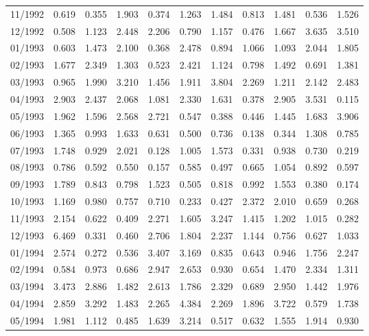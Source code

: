 \begin{tabular}{lrrrrrrrrrr}
11/1992 &  0.619 &  0.355 &  1.903 &  0.374 &  1.263 &  1.484 &  0.813 &  1.481 &  0.536 &  1.526 \\
12/1992 &  0.508 &  1.123 &  2.448 &  2.206 &  0.790 &  1.157 &  0.476 &  1.667 &  3.635 &  3.510 \\
01/1993 &  0.603 &  1.473 &  2.100 &  0.368 &  2.478 &  0.894 &  1.066 &  1.093 &  2.044 &  1.805 \\
02/1993 &  1.677 &  2.349 &  1.303 &  0.523 &  2.421 &  1.124 &  0.798 &  1.492 &  0.691 &  1.381 \\
03/1993 &  0.965 &  1.990 &  3.210 &  1.456 &  1.911 &  3.804 &  2.269 &  1.211 &  2.142 &  2.483 \\
04/1993 &  2.903 &  2.437 &  2.068 &  1.081 &  2.330 &  1.631 &  0.378 &  2.905 &  3.531 &  0.115 \\
05/1993 &  1.962 &  1.596 &  2.568 &  2.721 &  0.547 &  0.388 &  0.446 &  1.445 &  1.683 &  3.906 \\
06/1993 &  1.365 &  0.993 &  1.633 &  0.631 &  0.500 &  0.736 &  0.138 &  0.344 &  1.308 &  0.785 \\
07/1993 &  1.748 &  0.929 &  2.021 &  0.128 &  1.005 &  1.573 &  0.331 &  0.938 &  0.730 &  0.219 \\
08/1993 &  0.786 &  0.592 &  0.550 &  0.157 &  0.585 &  0.497 &  0.665 &  1.054 &  0.892 &  0.597 \\
09/1993 &  1.789 &  0.843 &  0.798 &  1.523 &  0.505 &  0.818 &  0.992 &  1.553 &  0.380 &  0.174 \\
10/1993 &  1.169 &  0.980 &  0.757 &  0.710 &  0.233 &  0.427 &  2.372 &  2.010 &  0.659 &  0.268 \\
11/1993 &  2.154 &  0.622 &  0.409 &  2.271 &  1.605 &  3.247 &  1.415 &  1.202 &  1.015 &  0.282 \\
12/1993 &  6.469 &  0.331 &  0.460 &  2.706 &  1.804 &  2.237 &  1.144 &  0.756 &  0.627 &  1.033 \\
01/1994 &  2.574 &  0.272 &  0.536 &  3.407 &  3.169 &  0.835 &  0.643 &  0.946 &  1.756 &  2.247 \\
02/1994 &  0.584 &  0.973 &  0.686 &  2.947 &  2.653 &  0.930 &  0.654 &  1.470 &  2.334 &  1.311 \\
03/1994 &  3.473 &  2.886 &  1.482 &  2.613 &  1.786 &  2.329 &  0.689 &  2.950 &  1.442 &  1.976 \\
04/1994 &  2.859 &  3.292 &  1.483 &  2.265 &  4.384 &  2.269 &  1.896 &  3.722 &  0.579 &  1.738 \\
05/1994 &  1.981 &  1.112 &  0.485 &  1.639 &  3.214 &  0.517 &  0.632 &  1.555 &  1.914 &  0.930 \\

\end{tabular}
